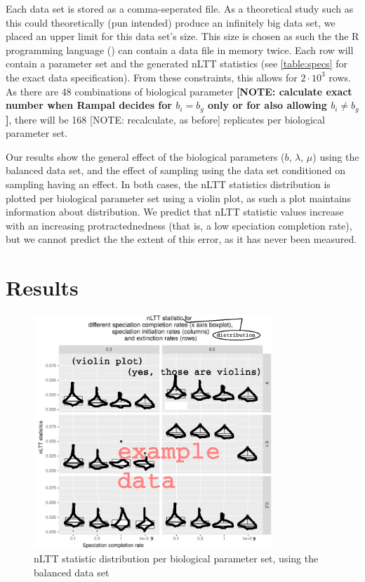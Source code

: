 \documentclass{article}
\begin{document}
Each data set is stored as a comma-seperated file. 
As a theoretical study such as this could theoretically (pun intended)
produce an infinitely big data set, we placed an upper limit 
for this data set's size. This size is chosen as such the 
the R programming language (\cite{r}) can contain a data file in
memory twice. Each row will contain a parameter set and the generated nLTT 
statistics (see \ref{table:specs} for the exact data specification).
From these constraints, this allows for $2 \cdot 10^3$ rows. As there are 48 combinations
of biological parameter \textbf{[NOTE: calculate exact number when Rampal decides
for $b_i = b_g$ only or for also allowing $b_i \neq b_g$]}, there will be 
168 {[NOTE: recalculate, as before]} replicates per biological parameter set.

Our results show the general effect of the biological 
parameters ($b$, $\lambda$, $\mu$) using the balanced data set,
and the effect of sampling using the data set conditioned on sampling having an effect.
In both cases, the nLTT statistics distribution is plotted per
biological parameter set using a violin plot, as such a plot 
maintains information about distribution.
We predict that nLTT statistic values increase 
with an increasing protractednedness (that is, a low speciation completion rate),
but we cannot predict the the extent of this error, as it has never been 
measured.

\section{Results}

\begin{figure}[!htbp]
  \includegraphics[width=0.8\textwidth]{fig_nltt_stats_per_setup.png}
  \caption{
    nLTT statistic distribution per biological parameter set, using the
    balanced data set
  }
\end{figure}
\end{document}
